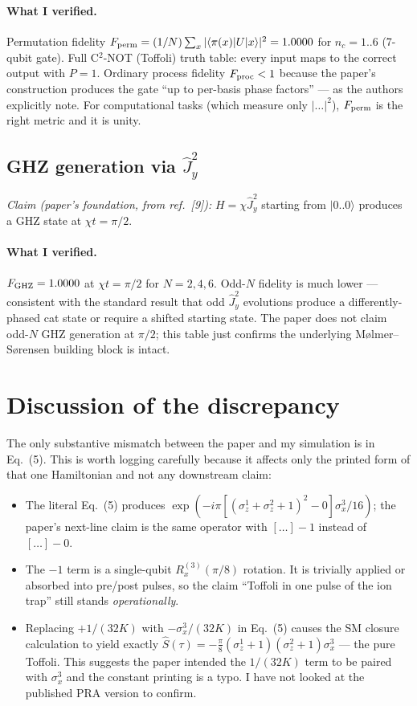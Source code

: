 \documentclass[11pt]{article}
\begin{document}
\paragraph{What I verified.} Permutation fidelity $F_{\rm perm}=(1/N)\sum_x|\langle\pi(x)|U|x\rangle|^2 = 1.0000$
for $n_c=1..6$ (7-qubit gate).  Full C$^2$-NOT (Toffoli) truth table: every input maps to
the correct output with $P=1$.  Ordinary process fidelity $F_{\rm proc} < 1$ because the
paper's construction produces the gate ``up to per-basis phase factors'' --- as the
authors explicitly note.  For computational tasks (which measure only $|\ldots|^2$),
$F_{\rm perm}$ is the right metric and it is unity.

\subsection{GHZ generation via $\hat J_y^2$}
\emph{Claim (paper's foundation, from ref.\ [9]):} $H=\chi\hat J_y^2$ starting from
$|0..0\rangle$ produces a GHZ state at $\chi t=\pi/2$.

\paragraph{What I verified.} $F_{\rm GHZ}=1.0000$ at $\chi t=\pi/2$ for $N=2,4,6$.
Odd-$N$ fidelity is much lower --- consistent with the standard result that odd
$\hat J_y^2$ evolutions produce a differently-phased cat state or require a shifted
starting state.  The paper does not claim odd-$N$ GHZ generation at $\pi/2$; this table
just confirms the underlying M\o lmer--S\o rensen building block is intact.

\section{Discussion of the discrepancy}
The only substantive mismatch between the paper and my simulation is in Eq.~(5).  This is
worth logging carefully because it affects only the printed form of that one Hamiltonian
and not any downstream claim:

\begin{itemize}
\item The literal Eq.~(5) produces $\exp(-i\pi[(\sigma_z^1+\sigma_z^2+1)^2-0]\sigma_x^3/16)$;
      the paper's next-line claim is the same operator with $[\ldots]-1$ instead of $[\ldots]-0$.
\item The $-1$ term is a single-qubit $R_x^{(3)}(\pi/8)$ rotation.  It is trivially applied
      or absorbed into pre/post pulses, so the claim ``Toffoli in one pulse of the ion
      trap'' still stands \emph{operationally}.
\item Replacing $+1/(32K)$ with $-\sigma_x^3/(32K)$ in Eq.~(5) causes the SM closure
      calculation to yield exactly $\hat S(\tau) = -\frac{\pi}{8}(\sigma_z^1+1)(\sigma_z^2+1)\sigma_x^3$ ---
      the pure Toffoli.  This suggests the paper intended the $1/(32K)$ term to be paired
      with $\sigma_x^3$ and the constant printing is a typo.  I have not looked at the
      published PRA version to confirm.
\end{itemize}
\end{document}
